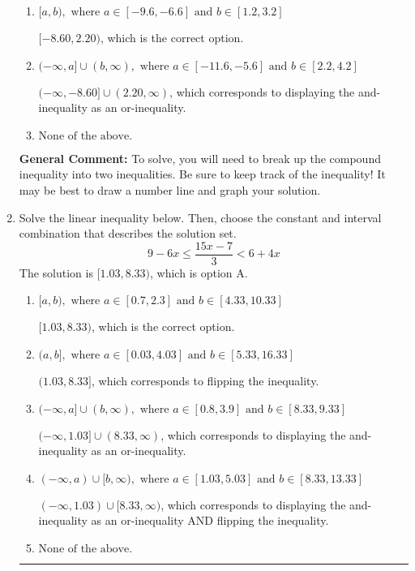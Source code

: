 \documentclass{extbook}[14pt]
\newcommand{\litem}[1]{\item #1

\rule{\textwidth}{0.4pt}}
\begin{document}
\begin{enumerate}
{\begin{enumerate}[label=\Alph*.]
$(-\infty, -8.60) \cup [2.20, \infty)$, which corresponds to displaying the and-inequality as an or-inequality AND flipping the inequality.
\item \( [a, b), \text{ where } a \in [-9.6, -6.6] \text{ and } b \in [1.2, 3.2] \)

$[-8.60, 2.20)$, which is the correct option.
\item \( (-\infty, a] \cup (b, \infty), \text{ where } a \in [-11.6, -5.6] \text{ and } b \in [2.2, 4.2] \)

$(-\infty, -8.60] \cup (2.20, \infty)$, which corresponds to displaying the and-inequality as an or-inequality.
\item \( \text{None of the above.} \)


\end{enumerate}

\textbf{General Comment:} To solve, you will need to break up the compound inequality into two inequalities. Be sure to keep track of the inequality! It may be best to draw a number line and graph your solution.
}
\litem{
Solve the linear inequality below. Then, choose the constant and interval combination that describes the solution set.
\[ 9 - 6 x \leq \frac{15 x - 7}{3} < 6 + 4 x \]The solution is \( [1.03, 8.33) \), which is option A.\begin{enumerate}[label=\Alph*.]
\item \( [a, b), \text{ where } a \in [0.7, 2.3] \text{ and } b \in [4.33, 10.33] \)

$[1.03, 8.33)$, which is the correct option.
\item \( (a, b], \text{ where } a \in [0.03, 4.03] \text{ and } b \in [5.33, 16.33] \)

$(1.03, 8.33]$, which corresponds to flipping the inequality.
\item \( (-\infty, a] \cup (b, \infty), \text{ where } a \in [0.8, 3.9] \text{ and } b \in [8.33, 9.33] \)

$(-\infty, 1.03] \cup (8.33, \infty)$, which corresponds to displaying the and-inequality as an or-inequality.
\item \( (-\infty, a) \cup [b, \infty), \text{ where } a \in [1.03, 5.03] \text{ and } b \in [8.33, 13.33] \)

$(-\infty, 1.03) \cup [8.33, \infty)$, which corresponds to displaying the and-inequality as an or-inequality AND flipping the inequality.
\item \( \text{None of the above.} \)


\end{enumerate}

}
\end{enumerate}
\end{document}
